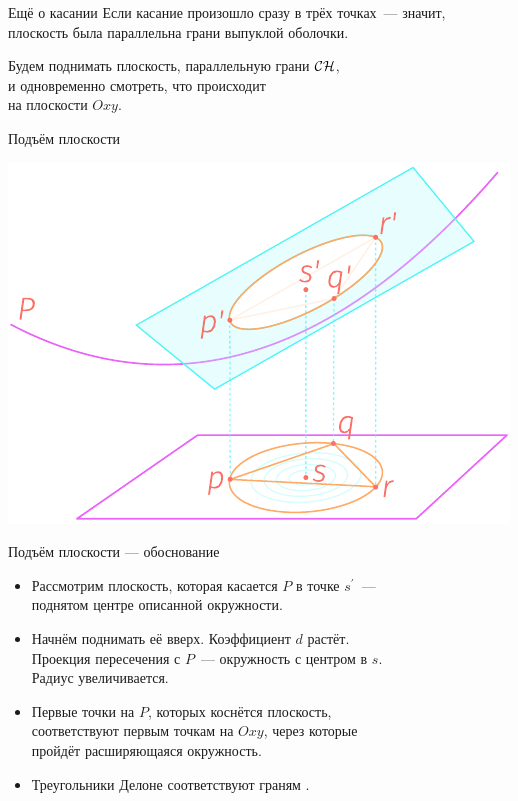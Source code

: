 \documentclass[12pt,aspectratio=169,svgnames]{beamer}
\begin{document}
\begin{frame}{Ещё о касании}
	Если касание произошло сразу в трёх точках~— значит, \\
	плоскость была параллельна грани выпуклой оболочки.

	Будем поднимать плоскость, параллельную грани \(\mathcal{C}\mathcal{H}\), \\
	и одновременно смотреть, что происходит \\
	на плоскости \(Oxy\).
\end{frame}


\begin{frame}{Подъём плоскости}
\begin{center} \includegraphics[scale=1.1]{svg/paraboloid} \end{center}
\end{frame}


\begin{frame}{Подъём плоскости — обоснование}
\begin{itemize}
	\item Рассмотрим плоскость, которая касается \(P\) в точке \(s^\prime\)~— \\
	поднятом центре описанной окружности. \medskip

	\item Начнём поднимать её вверх. Коэффициент \(d\) растёт. \\
	Проекция пересечения с \(P\)~— окружность с центром в \(s\). \\
	Радиус увеличивается. \medskip

	\item Первые точки на \(P\), которых коснётся плоскость, \\
	соответствуют первым точкам на \(Oxy\), через которые \\
	пройдёт расширяющаяся окружность. \medskip

	\item Треугольники Делоне соответствуют граням \CH.
\end{itemize}
\end{frame}
\end{document}
